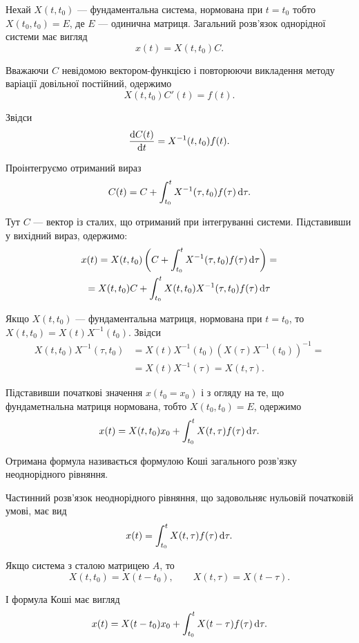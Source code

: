 Нехай $X(t, t_0)$ --- фундаментальна система, нормована при $t = t_0$ тобто $X(t_0, t_0) = E$, де $E$ --- одинична матриця. Загальний розв'язок однорідної системи має вигляд
\begin{equation*}
	x(t) = X(t, t_0) C.
\end{equation*}

Вважаючи $C$ невідомою вектором-функцією і повторюючи викладення методу варіації довільної постійний, одержимо
\begin{equation*}
	X(t, t_0) C'(t) = f(t).
\end{equation*}

Звідси
\begin{equation*}
	\frac{\mathop{}\!\mathrm{d} C(t)}{\mathop{}\!\mathrm{d} t} = X^{-1}(t, t_0) f(t).
\end{equation*}

Проінтегруємо отриманий вираз
\begin{equation*}
	C(t) = C + \int_{t_0}^t X^{-1}(\tau, t_0) f(\tau) \mathop{}\!\mathrm{d} \tau.
\end{equation*}

Тут $C$ --- вектор із сталих, що отриманий при інтегруванні системи. Підставивши у вихідний вираз, одержимо:
\begin{multline*}
	x(t) = X(t, t_0) \left( C + \int_{t_0}^t X^{-1}(\tau, t_0) f(\tau) \mathop{}\!\mathrm{d} \tau \right) = \\
	= X(t, t_0) C + \int_{t_0}^t X(t, t_0) X^{-1}(\tau, t_0) f(\tau) \mathop{}\!\mathrm{d} \tau 
\end{multline*}
  
Якщо $X(t, t_0)$ --- фундаментальна матриця, нормована при $t = t_0$, то $X(t, t_0) = X(t) X^{-1} (t_0)$. Звідси
\begin{align*}
	X(t, t_0) X^{-1}(\tau, t_0) &= X(t) X^{-1}(t_0) \left( X(\tau) X^{-1}(t_0) \right)^{-1} = \\
	&= X(t) X^{-1} (\tau) = X(t, \tau).
\end{align*}
 
Підставивши початкові значення $x(t_0 = x_0)$ і з огляду на те, що фундаметнальна матриця нормована, тобто $X(t_0, t_0) = E$, одержимо
\begin{equation*}
	x(t) = X(t, t_0) x_0 + \int_{t_0}^t X(t, \tau) f(\tau) \mathop{}\!\mathrm{d} \tau.
\end{equation*}

Отримана формула називається формулою Коші загального розв'язку неоднорідного рівняння. \parvskip

Частинний розв'язок неоднорідного рівняння, що задовольняє нульовій початковій умові, має вид
\begin{equation*}
	x(t) = \int_{t_0}^t X(t, \tau) f(\tau) \mathop{}\!\mathrm{d} \tau.
\end{equation*}

Якщо система з сталою матрицею $A$, то
\begin{equation*}
	X(t, t_0) = X(t - t_0), \qquad X(t, \tau) = X(t - \tau).
\end{equation*}

І формула Коші має вигляд
\begin{equation*}
	x(t) = X(t - t_0) x_0 + \int_{t_0}^t X(t - \tau) f(\tau) \mathop{}\!\mathrm{d} \tau.
\end{equation*}
